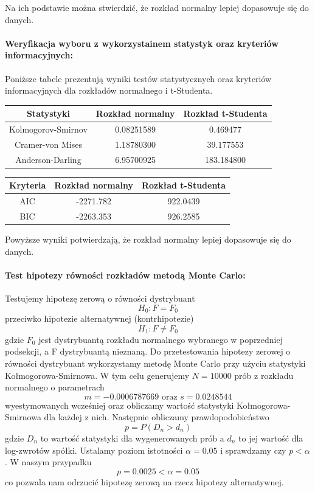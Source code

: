 \documentclass[a4paper,11pt]{article}
\begin{document}
Na ich podstawie można stwierdzić, że rozkład normalny lepiej dopasowuje się do danych.


\newpage
\paragraph{Weryfikacja wyboru z wykorzystainem statystyk oraz kryteriów informacyjnych:}
Poniższe tabele prezentują wyniki testów statystycznych oraz kryteriów informacyjnych dla rozkładów normalnego i t-Studenta.

\begin{center}
\begin{tabular}{|c|c|c|}
    \hline
    Statystyki & Rozkład normalny & Rozkład t-Studenta  \\ \hline
    Kolmogorov-Smirnov & 0.08251589 & 0.469477 \\ \hline
    Cramer-von Mises & 1.18780300 & 39.177553 \\ \hline
    Anderson-Darling & 6.95700925 & 183.184800 \\ \hline
\end{tabular}
\end{center}

\begin{center}
\begin{tabular}{|c|c|c|}
    \hline
    Kryteria & Rozkład normalny & Rozkład t-Studenta  \\ \hline
    AIC & -2271.782 & 922.0439 \\ \hline
    BIC & -2263.353 & 926.2585 \\ \hline
\end{tabular}
\end{center}

Powyższe wyniki potwierdzają, że rozkład normalny lepiej dopasowuje się do danych.


\paragraph{Test hipotezy równości rozkładów metodą Monte Carlo:}
Testujemy hipotezę zerową o równości dystrybuant
$$H_0: F = F_0$$
przeciwko hipotezie alternatywnej (kontrhipotezie)
$$H_1: F \neq F_0$$
gdzie $F_0$ jest dystrybuantą rozkładu normalnego wybranego w poprzedniej podsekcji, a F dystrybuantą nieznaną.
\newline Do przetestowania hipotezy zerowej o równości dystrybuant wykorzystamy metodę Monte Carlo przy użyciu statystyki Kołmogorowa-Smirnowa. 
\newline W tym celu generujemy $N=10000$ prób z rozkładu normalnego o parametrach 
$$m = -0.0006787669 \text{ oraz } s = 0.0248544$$ 
wyestymowanych wcześniej oraz obliczamy wartość statystyki Kołmogorowa-Smirnowa dla każdej z nich. 
\newline Następnie obliczamy prawdopodobieństwo 
$$p = P(D_n > d_n)$$ 
gdzie $D_n$ to wartość statystyki dla wygenerowanych prób a $d_n$ to jej wartość dla log-zwrotów spółki. 
\newline Ustalamy poziom istotności $\alpha = 0.05$ i sprawdzamy czy $p < \alpha$. W naszym przypadku 
$$p = 0.0025 < \alpha = 0.05$$ 
co pozwala nam odrzucić hipotezę zerową na rzecz hipotezy alternatywnej.
\end{document}
